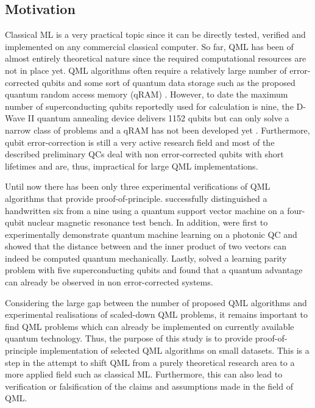 \documentclass[a4paper]{article}
\newcommand*{\0}{$\ket{0}$}
\newcommand*{\1}{$\ket{1}$}
\begin{document}
\newpage

\subsection{Motivation}
\label{subsec:motivation}

Classical ML is a very practical topic since it can be directly tested, verified and implemented on any commercial classical computer. So far, QML has been of almost entirely theoretical nature since the required computational resources are not in place yet. QML algorithms often require a relatively large number of error-corrected qubits and some sort of quantum data storage such as the proposed quantum random access memory (qRAM) \citep{qRAM}. However, to date the maximum number of superconducting qubits reportedly used for calculation is nine, the D-Wave II quantum annealing device delivers 1152 qubits but can only solve a narrow class of problems and a qRAM has not been developed yet \citep{hydrogensimulation, dwave2}. Furthermore, qubit error-correction is still a very active research field and most of the described preliminary QCs deal with non error-corrected qubits with short lifetimes and are, thus, impractical for large QML implementations.

Until now there has been only three experimental verifications of QML algorithms that provide proof-of-principle. \cite{Li2015} successfully distinguished a handwritten six from a nine using a quantum support vector machine on a four-qubit nuclear magnetic resonance test bench. In addition, \cite{Cai2015} were first to experimentally demonstrate quantum machine learning on a photonic QC and showed that the distance between and the inner product of two vectors can indeed be computed quantum mechanically. Lastly, \cite{Riste2015} solved a learning parity problem with five superconducting qubits and found that a quantum advantage can already be observed in non error-corrected systems.

Considering the large gap between the number of proposed QML algorithms and experimental realisations of scaled-down QML problems, it remains important to find QML problems which can already be implemented on currently available quantum technology. Thus, the purpose of this study is to provide proof-of-principle implementation of selected QML algorithms on small datasets. This is a step in the attempt to shift QML from a purely theoretical research area to a more applied field such as classical ML. Furthermore, this can also lead to verification or falsification of the claims and assumptions made in the field of QML. 
\end{document}
